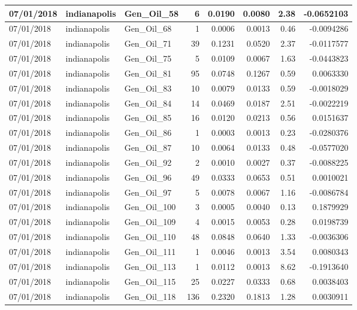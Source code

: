 \documentclass[
  letterpaper,
  DIV=11,
  numbers=noendperiod]{scrartcl}
\begin{document}
\begin{tabular}{l|l|l|r|r|r|r|r}
\hline
07/01/2018 & indianapolis & Gen\_Oil\_58 & 6 & 0.0190 & 0.0080 & 2.38 & -0.0652103\\
\hline
07/01/2018 & indianapolis & Gen\_Oil\_68 & 1 & 0.0006 & 0.0013 & 0.46 & -0.0094286\\
\hline
07/01/2018 & indianapolis & Gen\_Oil\_71 & 39 & 0.1231 & 0.0520 & 2.37 & -0.0117577\\
\hline
07/01/2018 & indianapolis & Gen\_Oil\_75 & 5 & 0.0109 & 0.0067 & 1.63 & -0.0443823\\
\hline
07/01/2018 & indianapolis & Gen\_Oil\_81 & 95 & 0.0748 & 0.1267 & 0.59 & 0.0063330\\
\hline
07/01/2018 & indianapolis & Gen\_Oil\_83 & 10 & 0.0079 & 0.0133 & 0.59 & -0.0018029\\
\hline
07/01/2018 & indianapolis & Gen\_Oil\_84 & 14 & 0.0469 & 0.0187 & 2.51 & -0.0022219\\
\hline
07/01/2018 & indianapolis & Gen\_Oil\_85 & 16 & 0.0120 & 0.0213 & 0.56 & 0.0151637\\
\hline
07/01/2018 & indianapolis & Gen\_Oil\_86 & 1 & 0.0003 & 0.0013 & 0.23 & -0.0280376\\
\hline
07/01/2018 & indianapolis & Gen\_Oil\_87 & 10 & 0.0064 & 0.0133 & 0.48 & -0.0577020\\
\hline
07/01/2018 & indianapolis & Gen\_Oil\_92 & 2 & 0.0010 & 0.0027 & 0.37 & -0.0088225\\
\hline
07/01/2018 & indianapolis & Gen\_Oil\_96 & 49 & 0.0333 & 0.0653 & 0.51 & 0.0010021\\
\hline
07/01/2018 & indianapolis & Gen\_Oil\_97 & 5 & 0.0078 & 0.0067 & 1.16 & -0.0086784\\
\hline
07/01/2018 & indianapolis & Gen\_Oil\_100 & 3 & 0.0005 & 0.0040 & 0.13 & 0.1879929\\
\hline
07/01/2018 & indianapolis & Gen\_Oil\_109 & 4 & 0.0015 & 0.0053 & 0.28 & 0.0198739\\
\hline
07/01/2018 & indianapolis & Gen\_Oil\_110 & 48 & 0.0848 & 0.0640 & 1.33 & -0.0036306\\
\hline
07/01/2018 & indianapolis & Gen\_Oil\_111 & 1 & 0.0046 & 0.0013 & 3.54 & 0.0080343\\
\hline
07/01/2018 & indianapolis & Gen\_Oil\_113 & 1 & 0.0112 & 0.0013 & 8.62 & -0.1913640\\
\hline
07/01/2018 & indianapolis & Gen\_Oil\_115 & 25 & 0.0227 & 0.0333 & 0.68 & 0.0038403\\
\hline
07/01/2018 & indianapolis & Gen\_Oil\_118 & 136 & 0.2320 & 0.1813 & 1.28 & 0.0030911\\

\end{tabular}
\end{document}
